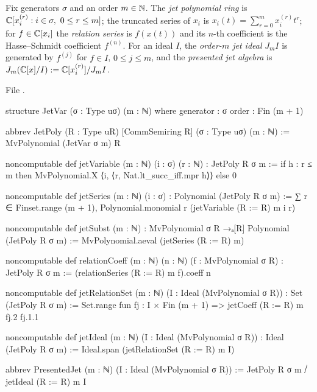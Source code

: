 \begin{definition}\label{l11:def:jets}
Fix generators $\sigma$ and an order $m\in{\mathbb{N}}$. The \emph{jet polynomial ring} is
${\mathbb{C}}[x_i^{(r)} : i\in\sigma,\ 0\le r\le m]$; the truncated series of $x_i$ is $x_i(t) = \sum_{r=0}^mx_i^{(r)}t^r$;
for $f\in{\mathbb{C}}[x_i]$ the \emph{relation series} is $f(x(t))$ and its $n$-th coefficient is the Hasse--Schmidt
coefficient $f^{(n)}$. For an ideal $I$, the \emph{order-$m$ jet ideal} $J_mI$ is generated by $f^{(j)}$ for $f\in I$,
$0\le j\le m$, and the \emph{presented jet algebra} is $J_m({\mathbb{C}}[x]/I) := {\mathbb{C}}[x_i^{(r)}]/J_mI$.
\end{definition}
\noindent File .
\begin{leancode}
structure JetVar (σ : Type uσ) (m : ℕ) where
  generator : σ
  order : Fin (m + 1)

abbrev JetPoly (R : Type uR) [CommSemiring R] (σ : Type uσ) (m : ℕ) :=
  MvPolynomial (JetVar σ m) R

noncomputable def jetVariable (m : ℕ) (i : σ) (r : ℕ) : JetPoly R σ m :=
  if h : r ≤ m then
    MvPolynomial.X ⟨i, ⟨r, Nat.lt_succ_iff.mpr h⟩⟩
  else
    0

noncomputable def jetSeries (m : ℕ) (i : σ) : Polynomial (JetPoly R σ m) :=
  ∑ r ∈ Finset.range (m + 1), Polynomial.monomial r (jetVariable (R := R) m i r)

noncomputable def jetSubst (m : ℕ) :
    MvPolynomial σ R →ₐ[R] Polynomial (JetPoly R σ m) :=
  MvPolynomial.aeval (jetSeries (R := R) m)

noncomputable def relationCoeff (m : ℕ) (n : ℕ) (f : MvPolynomial σ R) :
    JetPoly R σ m :=
  (relationSeries (R := R) m f).coeff n

noncomputable def jetRelationSet (m : ℕ) (I : Ideal (MvPolynomial σ R)) :
    Set (JetPoly R σ m) :=
  Set.range fun fj : I × Fin (m + 1) => jetCoeff (R := R) m fj.2 fj.1.1

noncomputable def jetIdeal (m : ℕ) (I : Ideal (MvPolynomial σ R)) :
    Ideal (JetPoly R σ m) :=
  Ideal.span (jetRelationSet (R := R) m I)

abbrev PresentedJet (m : ℕ) (I : Ideal (MvPolynomial σ R)) :=
  JetPoly R σ m ⧸ jetIdeal (R := R) m I
\end{leancode}

